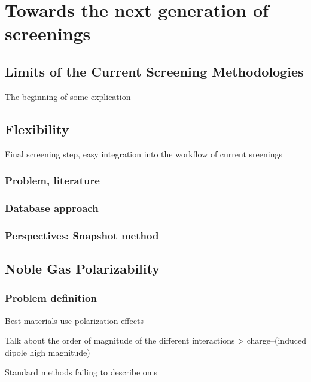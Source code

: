 \documentclass[main]{subfiles}
\begin{document}
\chapter{Towards the next generation of screenings}
\vspace*{-1\baselineskip}

\section{Limits of the Current Screening Methodologies}


The beginning of some explication

\section{Flexibility}
Final screening step, easy integration into the workflow of current sreenings
\subsection{Problem, literature}

\subsection{Database approach}

\subsection{Perspectives: Snapshot method}

\section{Noble Gas Polarizability}

\subsection{Problem definition}

Best materials use polarization effects \autocite{Li_2019,Pei_2022}

Talk about the order of magnitude of the different interactions > charge--(induced dipole high magnitude)

Standard methods failing to describe oms\autocite{Perry_2014} 

\end{document}
